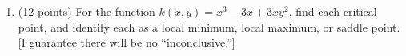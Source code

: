 \documentclass[11pt]{article}
\newcommand{\mysqrt}[1]{%
  \mathpalette\foo{#1}%
}
\newcommand{\foo}[2]{%
  \sbox0{$#1\sqrt{#2}$}%
  \begin{tikzpicture}[baseline=(sqrt.base)]
    \node[inner sep=0, outer sep=0] (sqrt) {$#1\sqrt{#2}$}; %
    \draw([yshift=-0.045em]sqrt.north east) -- ++(0,-0.5ex); %
  \end{tikzpicture}%
}
\newcommand{\mb}[1]{\mathbf{#1}}
\begin{document}
\begin{enumerate}
{          Now we can build the directional derivative:
          \begin{align*}
            D_{\mathbf{v}} & = \frac{(h_{x}(3,1) + h_{y}(3,1)) \cdot \mb{v}}{\mysqrt{29}} \\
                           & = \frac{-\frac{23}{4}(5) - \frac{3}{4}(-2)}{\mysqrt{29}}     \\
                           & = \frac{-\frac{115}{4} + \frac{6}{4}}{\mysqrt{29}}           \\
                           & = \frac{-\frac{109}{4}}{\mysqrt{29}}                         \\
                           & = \boxed{-\frac{109}{4\mysqrt{29}}}.
          \end{align*}
        }
        \newpage

  \item (12 points) For the function \(k(x,y) = x^{3} - 3x + 3xy^{2}\), find each critical point, and identify each as a local minimum, local maximum, or saddle point. [I guarantee there will be no ``inconclusive.'']


\end{enumerate}
\end{document}
